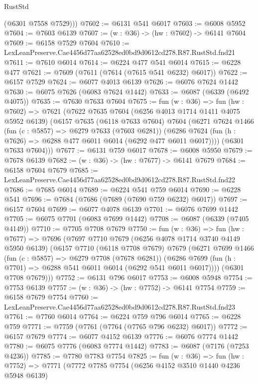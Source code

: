 \begin{lexlean}{RustStd}
\begin{coremodule}
{{        (@6301 @7558 @7529)))
@7602 := @6131 @541 @6017
@7603 := @6008 @5952
@7604 := @7603 @6139
@7607 := (w : @36) -> (hw : @7602) -> @6141 @7604
@7609 := @6158 @7529 @7604
@7610 := LexLeanPreserve.Cae4456d77aa62528ed0bd9d0612cd278.R87.RustStd.fnd21
@7611 := @7610 @6014
@7614 := @6224 @477 @541 @6014
@7615 := @6228 @477
@7621 := @7609 (@7611 (@7614 (@7615 @541 @6232) @6017))
@7622 := @6157 @7529
@7624 := @6077 @4013 @6139
@7626 := @6076 @7624 @1442
@7630 := @6075 @7626 (@6083 @7624 @1442)
@7633 := @6087 (@6339 (@6492 @4075))
@7635 := @7630 @7633 @7604
@7675 := fun (w : @36) =>
  fun (hw : @7602) =>
  @7621
    (@7622
      @7635
      @7604
      (@6256 @4013 @1714 @1411 @4075 @5952 @6139)
      (@6157
        @7635
        (@6118 @7633 @7604)
        @7604
        (@6271
          @7624
          @1466
          (fun (c : @5857) => @6279 @7633 (@7603 @6281))
          (@6286 @7624 (fun (h : @7626) => @6288 @477 @6011 @6014 (@6292 @477 @6011 @6017))))
        (@6301 @7633 @7604)))
@7677 := @6131 @759 @6017
@7678 := @6008 @5950
@7679 := @7678 @6139
@7682 := (w : @36) -> (hw : @7677) -> @6141 @7679
@7684 := @6158 @7604 @7679
@7685 := LexLeanPreserve.Cae4456d77aa62528ed0bd9d0612cd278.R87.RustStd.fnd22
@7686 := @7685 @6014
@7689 := @6224 @541 @759 @6014
@7690 := @6228 @541
@7696 := @7684 (@7686 (@7689 (@7690 @759 @6232) @6017))
@7697 := @6157 @7604
@7699 := @6077 @4078 @6139
@7701 := @6076 @7699 @1442
@7705 := @6075 @7701 (@6083 @7699 @1442)
@7708 := @6087 (@6339 (@7405 @4149))
@7710 := @7705 @7708 @7679
@7750 := fun (w : @36) =>
  fun (hw : @7677) =>
  @7696
    (@7697
      @7710
      @7679
      (@6256 @4078 @1714 @3740 @4149 @5950 @6139)
      (@6157
        @7710
        (@6118 @7708 @7679)
        @7679
        (@6271
          @7699
          @1466
          (fun (c : @5857) => @6279 @7708 (@7678 @6281))
          (@6286 @7699 (fun (h : @7701) => @6288 @541 @6011 @6014 (@6292 @541 @6011 @6017))))
        (@6301 @7708 @7679)))
@7752 := @6131 @796 @6017
@7753 := @6008 @5948
@7754 := @7753 @6139
@7757 := (w : @36) -> (hw : @7752) -> @6141 @7754
@7759 := @6158 @7679 @7754
@7760 := LexLeanPreserve.Cae4456d77aa62528ed0bd9d0612cd278.R87.RustStd.fnd23
@7761 := @7760 @6014
@7764 := @6224 @759 @796 @6014
@7765 := @6228 @759
@7771 := @7759 (@7761 (@7764 (@7765 @796 @6232) @6017))
@7772 := @6157 @7679
@7774 := @6077 @4152 @6139
@7776 := @6076 @7774 @1442
@7780 := @6075 @7776 (@6083 @7774 @1442)
@7783 := @6087 (@7176 (@7253 @4236))
@7785 := @7780 @7783 @7754
@7825 := fun (w : @36) =>
  fun (hw : @7752) =>
  @7771
    (@7772
      @7785
      @7754
      (@6256 @4152 @3510 @1440 @4236 @5948 @6139)
}}
\end{coremodule}
\end{lexlean}
